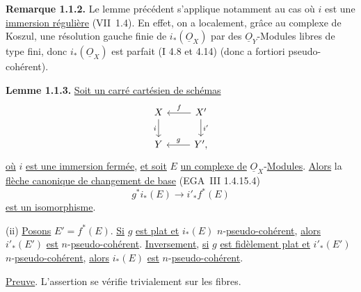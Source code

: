 \textbf{Remarque 1.1.2.} Le lemme précédent s'applique notamment au cas où \(i\) est une \uline{immersion régulière} (VII~1.4). En effet, on a localement, grâce au complexe de Koszul, une résolution gauche finie de \(i_*(\underline{O}_X)\) par des \(\underline{O}_Y\)-Modules libres de type fini, donc \(i_*(\underline{O}_X)\) est parfait (I 4.8 et 4.14) (donc a fortiori pseudo-cohérent).

\textbf{Lemme 1.1.3.} \uline{Soit un carré cartésien de schémas}
\[
\begin{tikzcd}
X \arrow[d,"i"'] & X' \arrow[l,"f"'] \arrow[d,"i'"]\\
Y & Y'{,} \arrow[l,"g"']
\end{tikzcd}
\]
\uline{où} \(i\) \uline{est une immersion fermée}, \uline{et soit} \(E\) \uline{un complexe de} \(\underline{O}_X\)-\uline{Modules}. \uline{Alors} la \uline{flèche canonique de changement de base} (EGA~III 1.4.15.4)
\[
  g^*i_*(E)\longrightarrow i'_*f^*(E)
\]
\uline{est un isomorphisme}.

(ii) \uline{Posons} \(E'=f^*(E)\). \uline{Si} \(g\) \uline{est plat et} \(i_*(E)\) \(n\)-\uline{pseudo-cohérent}, \uline{alors} \(i'_*(E')\) \uline{est} \(n\)-\uline{pseudo-cohérent}. \uline{Inversement}, \uline{si} \(g\) \uline{est fidèlement plat et} \(i'_*(E')\) \(n\)-\uline{pseudo-cohérent}, \uline{alors} \(i_*(E)\) \uline{est} \(n\)-\uline{pseudo-cohérent}.

\uline{Preuve}. L'assertion se vérifie trivialement sur les fibres.

